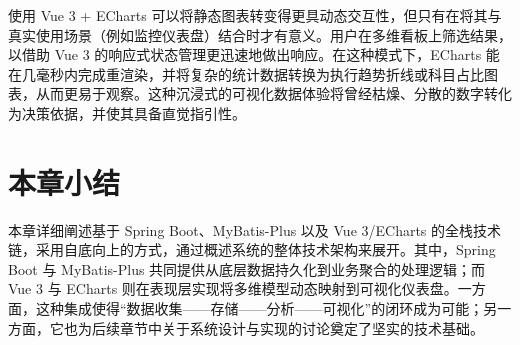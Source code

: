 使用 Vue 3 + ECharts 可以将静态图表转变得更具动态交互性，但只有在将其与真实使用场景（例如监控仪表盘）结合时才有意义。用户在多维看板上筛选结果，以借助 Vue 3 的响应式状态管理更迅速地做出响应。在这种模式下，ECharts 能在几毫秒内完成重渲染，并将复杂的统计数据转换为执行趋势折线或科目占比图表，从而更易于观察。这种沉浸式的可视化数据体验将曾经枯燥、分散的数字转化为决策依据，并使其具备直觉指引性。

\section{本章小结}
本章详细阐述基于 Spring Boot、MyBatis-Plus 以及 Vue 3/ECharts 的全栈技术链，采用自底向上的方式，通过概述系统的整体技术架构来展开。其中，Spring Boot 与 MyBatis-Plus 共同提供从底层数据持久化到业务聚合的处理逻辑；而 Vue 3 与 ECharts 则在表现层实现将多维模型动态映射到可视化仪表盘。一方面，这种集成使得“数据收集——存储——分析——可视化”的闭环成为可能；另一方面，它也为后续章节中关于系统设计与实现的讨论奠定了坚实的技术基础。
